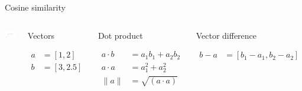 \documentclass[
  10pt,
  ignorenonframetext,
  x11names, dvipsnames, bibspacing,natbib, table]{beamer}
\begin{document}
\begin{frame}{Cosine similarity}
\protect\hypertarget{cosine-similarity-2}{}
\begin{columns}
    

\begin{center}\includegraphics[width=1\linewidth]{presentationBoston_files/figure-beamer/cosine3-1} \end{center}




\footnotesize 


\begin{block}{Vectors}

\begin{align*}
a  & = [1,2]\\
b  &= [3,2.5]
\end{align*}

\end{block}


\begin{block}{Dot product}

\begin{align*}
a \cdot b & = a_1 b_1 + a_2 b_2\\
a \cdot a & = a_1^2 + a_2 ^ 2 \\
\lVert a\rVert & = \sqrt{(a \cdot a)}
\end{align*}

\end{block}


\begin{block}{Vector difference}

\begin{align*}
b - a & = [b_1- a_1, b_2 - a_2 ]
\end{align*}

\end{block}

\end{columns}
\end{frame}
\end{document}
